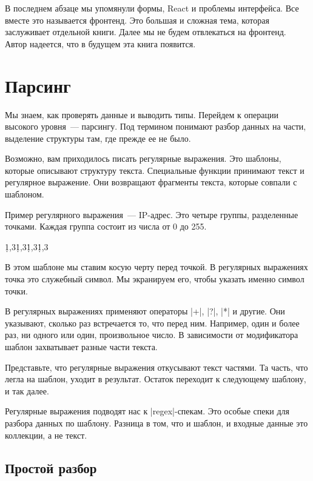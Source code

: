 В последнем абзаце мы упомянули формы, React и проблемы интерфейса. Все вместе
это называется фронтенд. Это большая и сложная тема, которая заслуживает
отдельной книги. Далее мы не будем отвлекаться на фронтенд. Автор надеется, что
в будущем эта книга появится.

\section{Парсинг}

Мы знаем, как проверять данные и выводить типы. Перейдем к операции высокого
уровня~--- парсингу. Под термином понимают разбор данных на части, выделение
структуры там, где прежде ее не было.

Возможно, вам приходилось писать регулярные выражения. Это шаблоны, которые
описывают структуру текста. Специальные функции принимают текст и регулярное
выражение. Они возвращают фрагменты текста, которые совпали с шаблоном.

Пример регулярного выражения~--- IP-адрес. Это четыре группы, разделенные
точками. Каждая группа состоит из числа от 0 до 255.

\begin{english}
  \begin{clojure}
\d{1,3}\.\d{1,3}\.\d{1,3}\.\d{1,3}
  \end{clojure}
\end{english}

В этом шаблоне мы ставим косую черту перед точкой. В регулярных выражениях точка
это служебный символ. Мы экранируем его, чтобы указать именно символ точки.

В регулярных выражениях применяют операторы \spverb|+|, \spverb|?|, \spverb|*| и
другие. Они указывают, сколько раз встречается то, что перед ним. Например, один
и более раз, ни одного или один, произвольное число. В зависимости от
модификатора шаблон захватывает разные части текста.

Представьте, что регулярные выражения откусывают текст частями. Та часть, что
легла на шаблон, уходит в результат. Остаток переходит к следующему шаблону, и
так далее.

Регулярные выражения подводят нас к \spverb|regex|-спекам. Это особые спеки для
разбора данных по шаблону. Разница в том, что и шаблон, и входные данные это
коллекции, а не текст.

\subsection{Простой разбор}


